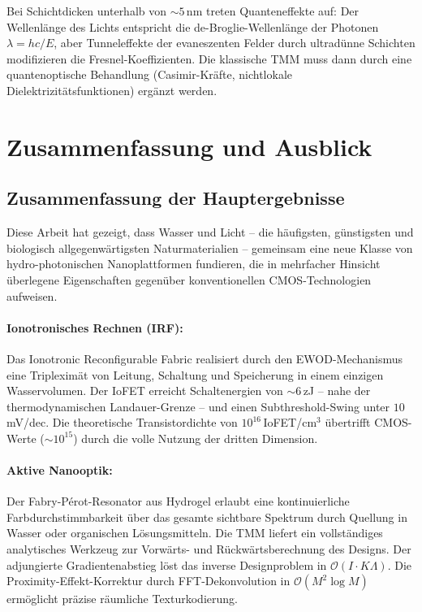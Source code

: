 ﻿\documentclass[a4paper,12pt]{scrreprt}
\theoremstyle{definition}
\newcommand{\ordre}[1]{\mathcal{O}\!\left(#1\right)}
\begin{document}
Bei Schichtdicken unterhalb von $\sim 5$\,nm treten Quanteneffekte auf:
Der Wellenlänge des Lichts entspricht die de-Broglie-Wellenlänge der
Photonen $\lambda = hc/E$, aber Tunneleffekte der evaneszenten Felder
durch ultradünne Schichten modifizieren die Fresnel-Koeffizienten. Die
klassische TMM muss dann durch eine quantenoptische Behandlung (Casimir-Kräfte,
nichtlokale Dielektrizitätsfunktionen) ergänzt werden.

\section{Zusammenfassung und Ausblick}

\subsection{Zusammenfassung der Hauptergebnisse}

Diese Arbeit hat gezeigt, dass Wasser und Licht -- die häufigsten, günstigsten
und biologisch allgegenwärtigsten Naturmaterialien -- gemeinsam eine neue Klasse
von hydro-photonischen Nanoplattformen fundieren, die in mehrfacher Hinsicht
überlegene Eigenschaften gegenüber konventionellen CMOS-Technologien aufweisen.

\paragraph{Ionotronisches Rechnen (IRF):}
Das Ionotronic Reconfigurable Fabric realisiert durch den EWOD-Mechanismus
eine Tripleximät von Leitung, Schaltung und Speicherung in einem einzigen
Wasservolumen. Der IoFET erreicht Schaltenergien von $\sim 6$\,zJ -- nahe
der thermodynamischen Landauer-Grenze -- und einen Subthreshold-Swing unter
$10$\,mV/dec. Die theoretische Transistordichte von $10^{16}$\,IoFET/cm$^3$
übertrifft CMOS-Werte ($\sim 10^{15}$) durch die volle Nutzung der dritten
Dimension.

\paragraph{Aktive Nanooptik:}
Der Fabry-P{\'e}rot-Resonator aus Hydrogel erlaubt eine kontinuierliche
Farbdurchstimmbarkeit über das gesamte sichtbare Spektrum durch Quellung
in Wasser oder organischen Lösungsmitteln. Die TMM liefert ein vollständiges
analytisches Werkzeug zur Vorwärts- und Rückwärtsberechnung des Designs.
Der adjungierte Gradientenabstieg löst das inverse Designproblem in
$\ordre{I \cdot K\Lambda}$. Die Proximity-Effekt-Korrektur durch FFT-Dekonvolution
in $\ordre{M^2 \log M}$ ermöglicht präzise räumliche Texturkodierung.
\end{document}
